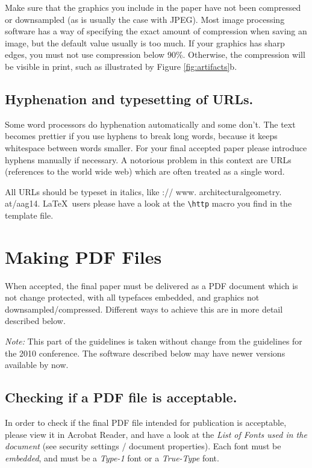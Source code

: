\documentclass[twoside]{article}
\begin{document}
Make sure that the graphics you include in the paper have not been 
compressed or downsampled (as is usually the case with JPEG). Most image 
processing software has a way of specifying the exact amount of 
compression when saving an image, but the default value usually is too 
much. If your graphics has sharp edges, you must not use compression below 
90\%. Otherwise, the compression will be visible in print, such as 
illustrated by Figure \ref{fig:artifacts}b.

\subsection{Hyphenation and typesetting of URLs.}

Some word processors do hyphenation automatically and some don't. The
text becomes prettier if you use hyphens to break long words, because
it keeps whitespace between words smaller. For your final accepted paper
please introduce hyphens manually if necessary. A notorious problem in this
context are URLs (references to the world wide web) which are often treated
as a single word. 

All URLs should be typeset in italics, like
{\http:// www. architecturalgeometry. at/aag14}. \LaTeX\ users
please have a look at the \verb|\http| macro you find in the template file.


\section{Making PDF Files}

When accepted, the final paper must be delivered as a PDF document which 
is not change protected, with all typefaces embedded, and graphics not 
downsampled/compressed. Different ways to achieve this are in more detail 
described below. 

{\it Note:} This part of the guidelines is taken without change from
the guidelines for the 2010 conference. The software described below
may have newer versions available by now.


\subsection{Checking if a PDF file is acceptable.}

In order to check if the final PDF file intended for publication is 
acceptable, please view it in Acrobat Reader, and have a look at the {\em 
List of Fonts used in the document} (see security settings / document 
properties). Each font must be {\em embedded}, and must be a {\em Type-1} 
font or a {\em True-Type} font.
\end{document}
